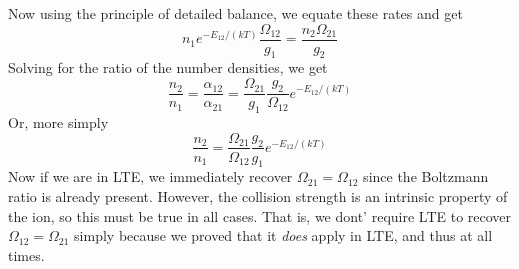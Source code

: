 \documentclass[10pt]{article}
\numberwithin{equation}{section}
\begin{document}
  Now using the principle of detailed balance, we equate these rates and get 
  \begin{equation}
    \label{eq:coll:14} n_1e^{-E_{12}/(kT)}\frac{\Omega_{12}}{g_1} = \frac{n_2 \Omega_{21}}{g_2}
  \end{equation}
  Solving for the ratio of the number densities, we get
  \begin{equation}
    \label{eq:coll:15} \frac{n_2}{n_1} = \frac{\alpha_{12}}{\alpha_{21}} = \frac{\Omega_{21}}{g_1}\frac{g_2}{\Omega_{12}} e^{-E_{12}/(kT)}
  \end{equation}
  Or, more simply
  \begin{equation}
    \label{eq:coll:16} \frac{n_2}{n_1} = \frac{\Omega_{21}}{\Omega_{12}} \frac{g_2}{g_1} e^{-E_{12}/(kT)}
  \end{equation}
  Now if we are in LTE, we immediately recover $\Omega_{21} = \Omega_{12}$ since the Boltzmann ratio is already present. However, the collision strength is an intrinsic property of the ion, so this must be true in all cases. That is, we dont' require LTE to recover $\Omega_{12}=\Omega_{21}$ simply because we proved that it \emph{does} apply in LTE, and thus at all times.
  
\end{document}
